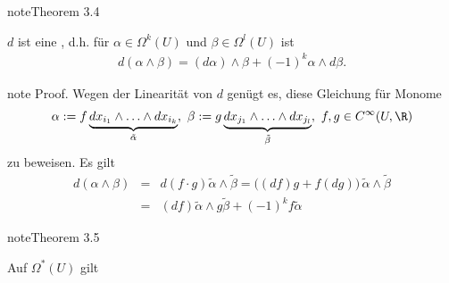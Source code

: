 \documentclass[letterpaper,10pt,english]{jupyterBook}
\begin{document}
\label{vektoranalysis/diffformen:Antiderivation}
\begin{sphinxadmonition}{note}{Theorem 3.4}



\sphinxAtStartPar
\(d\) ist eine , d.h. für \(\alpha\in\Omega^k(U)\) und \(\beta\in\Omega^l(U)\) ist
\begin{equation*}
\begin{split}d(\alpha\wedge\beta) = (d\alpha)\wedge\beta+(-1)^k\alpha\wedge d\beta.\end{split}
\end{equation*}\end{sphinxadmonition}

\begin{sphinxadmonition}{note}
\sphinxAtStartPar
Proof. Wegen der Linearität von \(d\) genügt es, diese Gleichung für Monome
\begin{equation*}
\begin{split}\alpha := f\underbrace{dx_{i_1}\wedge\ldots\wedge dx_{i_k}}_{\tilde
{\alpha}},\ \beta := g\underbrace{dx_{j_1}\wedge\ldots\wedge dx_{j_l}}_
{\tilde{\beta}},\ f,g\in C^\infty(U,\R)\end{split}
\end{equation*}
\sphinxAtStartPar
zu beweisen.
Es gilt
\begin{equation*}
\begin{split}d(\alpha\wedge\beta) &=& d(f\cdot g)\tilde{\alpha}\wedge
\tilde{\beta} = \big((df)g+f(dg)\big)\,\tilde{\alpha}\wedge\tilde{\beta}\\
&=& (df)\tilde{\alpha}\wedge g\tilde{\beta}+ (-1)^kf\tilde{\alpha}\end{split}
\end{equation*}\end{sphinxadmonition}
\label{vektoranalysis/diffformen:thm:dd}
\begin{sphinxadmonition}{note}{Theorem 3.5}



\sphinxAtStartPar
Auf \(\Omega^*(U)\) gilt
\end{sphinxadmonition}
\end{document}
